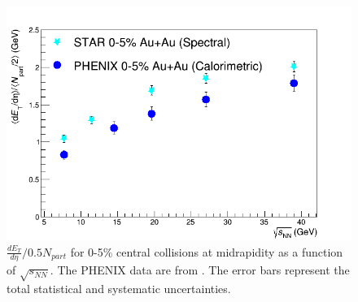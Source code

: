  
	\begin{figure}[h]
	  \centering
	  \includegraphics[width=4.5in]{figures/PHENIX_comparison2.png}
	  \caption{$\frac{dE_{T}}{d\eta}/0.5N_{part}$ for 0-5\% central collisions at midrapidity as a function of $\sqrt{s_{NN}}$. The PHENIX data are from \cite{PhysRevC.93.024901}. The error bars represent the total statistical and systematic uncertainties.}\label{fig:comparison}
	\end{figure}
	
	
	
